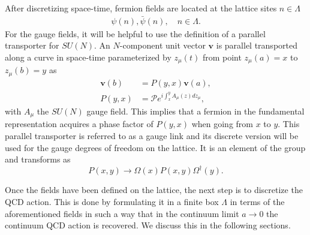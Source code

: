 After discretizing space-time, fermion fields are located at the lattice sites $n\in\Lambda$
\begin{gather}
\psi(n),\bar{\psi}(n), \quad
n\in\Lambda.
\end{gather}
For the gauge fields, it will be helpful to use the definition of a parallel transporter for $SU(N)$. An $N$-component unit vector $\boldsymbol{v}$ is parallel transported along a curve in space-time parameterized by $z_{\mu}(t)$ from point $z_{\mu}(a)=x$ to $z_{\mu}(b)=y$ as
\begin{align}
\boldsymbol{v}(b)&=P(y,x)\boldsymbol{v}(a),\\
P(y,x)&=\mathcal{P}e^{i\int_x^yA_{\mu}(z)dz_{\mu}},
\end{align}
with $A_{\mu}$ the $SU(N)$ gauge field. This implies that a fermion in the fundamental representation acquires a phase factor of $P(y,x)$ when going from $x$ to $y$. This parallel transporter is referred to as a gauge link and its discrete version will be used for the gauge degrees of freedom on the lattice. It is an element of the group and transforms as
\begin{equation}
P(x,y)\to\Omega(x)P(x,y)\Omega^{\dagger}(y).
\end{equation}

Once the fields have been defined on the lattice, the next step is to discretize the QCD action. This is done by formulating it in a finite box $\Lambda$ in terms of the aforementioned fields in such a way that in the continuum limit $a\rightarrow 0$ the continuum QCD action is recovered. We discuss this in the following sections.	

